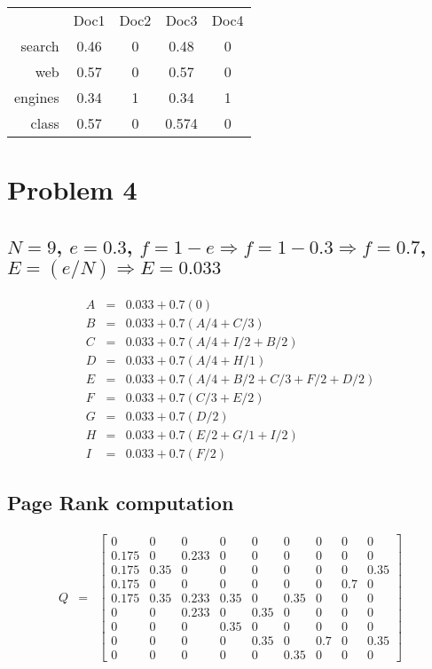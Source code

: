 \documentclass{article}
\begin{document}
\begin{tabular}{ r|c|c|c|c| }
\multicolumn{1}{r}{}
 & \multicolumn{1}{c}{Doc1}
 & \multicolumn{1}{c}{Doc2}
 & \multicolumn{1}{c}{Doc3}
 & \multicolumn{1}{c}{Doc4} \\
\cline{2-5}
search & 0.46 & 0 & 0.48 & 0 \\
\cline{2-5}
web & 0.57 & 0 & 0.57 & 0 \\
\cline{2-5}
engines & 0.34 & 1 & 0.34 & 1 \\
\cline{2-5}
class & 0.57 & 0 & 0.574 & 0 \\
\cline{2-5}
\end{tabular} 
\section[D]{Problem 4}
\subsection{ $N = 9$, $e = 0.3$, $f = 1 - e \Rightarrow f = 1 - 0.3 \Rightarrow f = 0.7$, $E = (e/N) \Rightarrow E = 0.033$}
\[
\begin{array}{rcl}A & = & 0.033 + 0.7(0)\\ B & = & 0.033 + 0.7(A/4 + C/3) \\ C & = & 0.033 + 0.7(A/4 + I/2 + B/2) \\ D & = & 0.033 + 0.7(A/4 + H/1) \\ E & = &0.033 + 0.7(A/4+B/2 + C/3 + F/2 + D/2) \\ F & = & 0.033 + 0.7(C/3 + E/2) \\ G & = & 0.033 + 0.7(D/2) \\ H & = & 0.033 + 0.7(E/2 + G/1 + I/2) \\ I & = & 0.033 + 0.7(F/2)
\end{array}
\]
\subsection{\textbf{Page Rank computation}}
\[
\begin{array}{lcl}Q & = &
\begin{bmatrix} 0 & 0 & 0 & 0 & 0 & 0 & 0 & 0 & 0 \\ 0.175 & 0 & 0.233 & 0 & 0 & 0 & 0 & 0 & 0 \\ 0.175 & 0. 35 & 0 & 0 & 0 & 0 & 0 & 0 & 0.35 \\ 0.175 & 0 & 0 & 0 & 0& 0 & 0 & 0.7 & 0 \\ 0.175 & 0.35 & 0.233 & 0.35 & 0 & 0.35 & 0 & 0 & 0 \\ 0 & 0 & 0.233 & 0 & 0.35 & 0 & 0 & 0 & 0 \\ 0 & 0 & 0 & 0.35 & 0 & 0 & 0 & 0 & 0 \\ 0 & 0 & 0 & 0 & 0.35 & 0 & 0.7 & 0 & 0.35 \\ 0 & 0 & 0 & 0 & 0 & 0.35 & 0 & 0 & 0
\end{bmatrix}
\end{array}
\]
\end{document}
